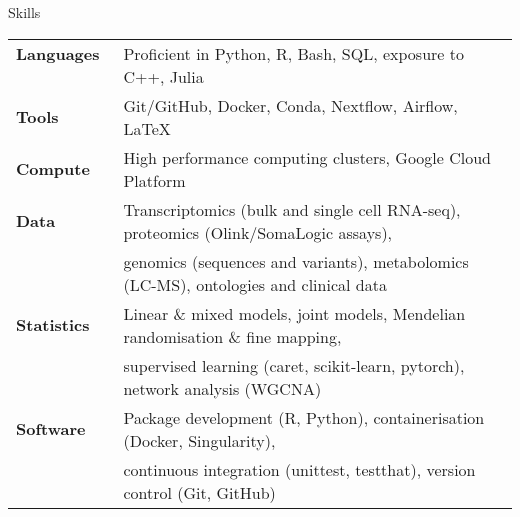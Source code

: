 \documentclass{resume}
\begin{document}
\begin{rSection}{Skills}

\begin{tabular}{ @{} >{\bfseries}l @{\hspace{3ex}} l }
Languages \ & Proficient in Python, R, Bash, SQL, exposure to C++, Julia \vspace{2pt plus 1pt minus 1pt} \\
Tools \ & Git/GitHub, Docker, Conda, Nextflow, Airflow, \LaTeX \vspace{2pt plus 1pt minus 1pt} \\
Compute \ & High performance computing clusters, Google Cloud Platform \vspace{2pt plus 1pt minus 1pt} \\
Data \ & Transcriptomics (bulk and single cell RNA-seq), proteomics (Olink/SomaLogic assays), \\
     \ & genomics (sequences and variants), metabolomics (LC-MS), ontologies and clinical data \vspace{2pt plus 1pt minus 1pt} \\
Statistics \ & Linear \& mixed models, joint models, Mendelian randomisation \& fine mapping, \\
           \ & supervised learning (caret, scikit-learn, pytorch), network analysis (WGCNA) \vspace{2pt plus 1pt minus 1pt} \\
Software \ & Package development (R, Python), containerisation (Docker, Singularity),   \\
         \ & continuous integration (unittest, testthat), version control (Git, GitHub) \\
\end{tabular}



\end{rSection}
\end{document}
